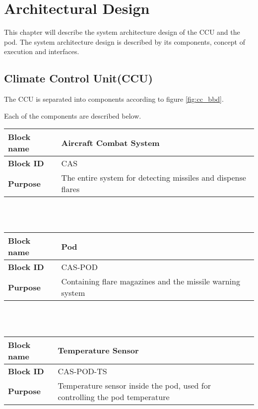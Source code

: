 
\thispagestyle{fancy}
\chapter{Architectural Design}
\label{chp:architectural}

This chapter will describe the system architecture design of the CCU and the pod.
The system architecture design is described by its components, concept of execution and interfaces.

\section{Climate Control Unit(CCU)}

The CCU is separated into components according to figure \ref{fig:cc_bbd}.


Each of the components are described below.\\

\begin{tabular}{|l|p{10cm}|}
    \hline
    \textbf{Block name}     & Aircraft Combat System \\
    \hline
    \textbf{Block ID}       & CAS \\
    \hline
    \textbf{Purpose}        & The entire system for detecting missiles and dispense flares \\
    \hline
\end{tabular}\\\\

\begin{tabular}{|l|p{10cm}|}
    \hline
    \textbf{Block name}     & Pod \\
    \hline
    \textbf{Block ID}       & CAS-POD \\
    \hline
    \textbf{Purpose}        & Containing flare magazines and the missile warning system\\
    \hline
\end{tabular}\\\\

\begin{tabular}{|l|p{10cm}|}
    \hline
    \textbf{Block name}     & Temperature Sensor \\
    \hline
    \textbf{Block ID}       & CAS-POD-TS \\
    \hline
    \textbf{Purpose}        & Temperature sensor inside the pod, used for controlling the pod temperature\\
    \hline
\end{tabular}\\\\

